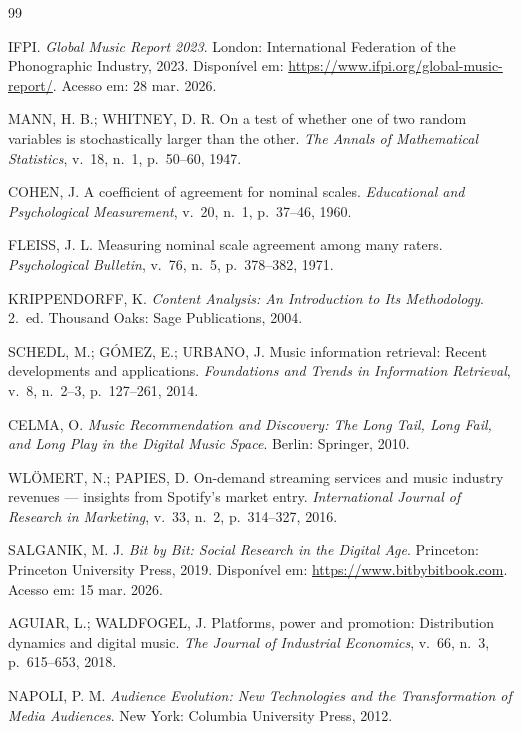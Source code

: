\documentclass[12pt, a4paper]{article}
\begin{document}
\begin{thebibliography}{99}

IFPI. \textit{Global Music Report 2023}. London: International Federation of the Phonographic Industry, 2023. Disponível em: \url{https://www.ifpi.org/global-music-report/}. Acesso em: 28 mar. 2026.

MANN, H. B.; WHITNEY, D. R. On a test of whether one of two random variables is stochastically larger than the other. \textit{The Annals of Mathematical Statistics}, v.~18, n.~1, p.~50--60, 1947.

COHEN, J. A coefficient of agreement for nominal scales. \textit{Educational and Psychological Measurement}, v.~20, n.~1, p.~37--46, 1960.

FLEISS, J. L. Measuring nominal scale agreement among many raters. \textit{Psychological Bulletin}, v.~76, n.~5, p.~378--382, 1971.

KRIPPENDORFF, K. \textit{Content Analysis: An Introduction to Its Methodology}. 2.~ed. Thousand Oaks: Sage Publications, 2004.

SCHEDL, M.; GÓMEZ, E.; URBANO, J. Music information retrieval: Recent developments and applications. \textit{Foundations and Trends in Information Retrieval}, v.~8, n.~2--3, p.~127--261, 2014.

CELMA, O. \textit{Music Recommendation and Discovery: The Long Tail, Long Fail, and Long Play in the Digital Music Space}. Berlin: Springer, 2010.

WLÖMERT, N.; PAPIES, D. On-demand streaming services and music industry revenues --- insights from Spotify's market entry. \textit{International Journal of Research in Marketing}, v.~33, n.~2, p.~314--327, 2016.

SALGANIK, M. J. \textit{Bit by Bit: Social Research in the Digital Age}. Princeton: Princeton University Press, 2019. Disponível em: \url{https://www.bitbybitbook.com}. Acesso em: 15 mar. 2026.

AGUIAR, L.; WALDFOGEL, J. Platforms, power and promotion: Distribution dynamics and digital music. \textit{The Journal of Industrial Economics}, v.~66, n.~3, p.~615--653, 2018.

NAPOLI, P. M. \textit{Audience Evolution: New Technologies and the Transformation of Media Audiences}. New York: Columbia University Press, 2012.

\end{thebibliography}
\end{document}
